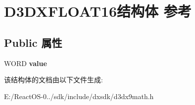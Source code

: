 \hypertarget{struct_d3_d_x_f_l_o_a_t16}{}\section{D3\+D\+X\+F\+L\+O\+A\+T16结构体 参考}
\label{struct_d3_d_x_f_l_o_a_t16}
\subsection*{Public 属性}
\begin{DoxyCompactItemize}
\item 
\mbox{\label{struct_d3_d_x_f_l_o_a_t16_aa3edaf571c317be7bc64c7fe6159c37e}} 
W\+O\+RD {\bfseries value}
\end{DoxyCompactItemize}


该结构体的文档由以下文件生成\+:\begin{DoxyCompactItemize}
\item 
E\+:/\+React\+O\+S-\/0../sdk/include/dxsdk/d3dx9math.\+h\end{DoxyCompactItemize}
